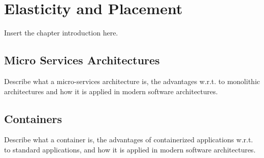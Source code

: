 \chapter{Elasticity and Placement}
\label{chp:elasticity-and-placement}


Insert the chapter introduction here.



\section{Micro Services Architectures}
\label{sec:micro-services-architectures}
Describe what a micro-services architecture is, the advantages w.r.t. to monolithic architectures and how it is applied in modern software architectures.



\section{Containers}
\label{sec:containers}
Describe what a container is, the advantages of containerized applications w.r.t. to standard applications, and how it is applied in modern software architectures.





